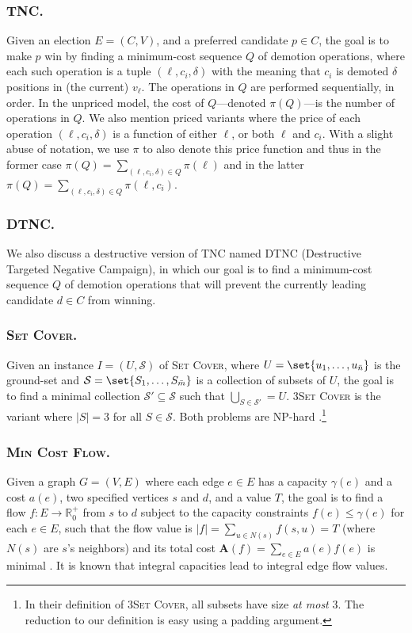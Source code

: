 \documentclass[letterpaper]{article} %
\newcommand{\preals}{\mathbb{R}^{+}_{0}}
\newcommand{\vecc}{\mathbf}
\newcommand{\CTSC}{\textsc{3Set Cover}}
\newcommand{\SC}{\textsc{Set Cover}}
\newcommand{\MCF}{\textsc{Min Cost Flow}}
\newcommand{\SB}{\textsc{TNC}}
\newcommand{\DTNC}{\textsc{DTNC}}
\newcommand{\abs}[1]{\lvert{#1}\rvert}
\newcommand{\Aoper}[1]{\vecc{A}({#1})}
\newcommand{\NP}{\mathrm{NP}}
\begin{document}
\subsubsection{\SB{}.} Given an election $E=(C,V)$, and a preferred candidate $p \in C$, the goal is to make $p$ win by finding a minimum-cost sequence $Q$ of demotion operations, where each such operation is a tuple $(\ell, c_i, \delta)$ with the meaning that $c_i$ is demoted $\delta$ positions in (the current) $v_\ell$. The operations in $Q$ are performed sequentially, in order. In the unpriced model, the cost of $Q$---denoted $\pi(Q)$---is the number of operations in $Q$. We also mention priced variants where the price of each operation $(\ell, c_i, \delta)$  is a function of either $\ell$, or both $\ell$ and $c_i$. With a slight abuse of notation, we use $\pi$ to also denote this price function and thus  in the former case $\pi(Q)=\sum_{(\ell, c_i, \delta) \in Q}\pi(\ell)$ and in the latter  $\pi(Q)=\sum_{(\ell, c_i, \delta) \in Q}\pi(\ell, c_i)$.
\subsubsection{\DTNC{}.} %
We also discuss a destructive version of \SB{} named \DTNC{} (Destructive Targeted Negative Campaign), in which our goal is to find a minimum-cost sequence $Q$ of demotion operations that will prevent the currently leading candidate $d \in C$ from winning.
\subsubsection{\SC{}.} Given an instance $I=(U,\mathcal{S})$ of \SC,  where $U=\set{u_1,\ldots,u_{\bar{n}}}$ is the ground-set and $\mathcal{S}=\set{S_1,\ldots,S_{\bar{m}}}$ is a collection of subsets of $U$,  the  goal is to find a minimal collection $\mathcal{S}' \subseteq \mathcal{S}$ such that $\bigcup_{S \in \mathcal{S}'} = U$. \CTSC{} is the variant where $\abs{S} = 3$ for all $S \in \mathcal{S}$. Both problems are $\NP$-hard \cite{garey1979computers}.\footnote{In their definition of \CTSC{}, all subsets have size \emph{at most} $3$. The reduction to our definition is easy using a padding argument.}
\subsubsection{\MCF{}.} Given a graph $G=(V,E)$ where each edge $e \in E$ has  a capacity $\gamma(e)$ and a cost $a(e)$, two specified vertices $s$ and $d$, and a value $T$, the goal is to find a flow $f\colon E \to \preals$ from $s$ to $d$ subject to the capacity constraints $f(e) \leq \gamma(e)$ for each $e \in E$, such that the flow value is $\abs{f} =\sum_{u \in  N(s)}f(s,u) = T$ (where $N(s)$ are $s$'s neighbors) and its total cost $\Aoper{f} = \sum_{e \in E}a(e)f(e)$ is minimal \cite{edmonds1972theoretical}. It is known that integral capacities lead to integral  edge flow values.
\end{document}
